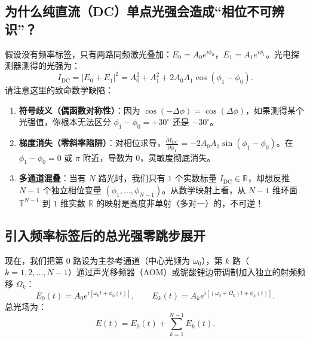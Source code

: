 \documentclass[UTF8, a4paper, 11pt]{ctexart}
\newcommand{\R}{\mathbb{R}}
\begin{document}
\subsection{为什么纯直流（DC）单点光强会造成“相位不可辨识”？}

假设没有频率标签，只有两路同频激光叠加：$E_0 = A_0 e^{i\phi_0}$，$E_1 = A_1 e^{i\phi_1}$。光电探测器测得的光强为：
\[
    I_{\mathrm{DC}} = |E_0 + E_1|^2 = A_0^2 + A_1^2 + 2A_0 A_1 \cos(\phi_1 - \phi_0).
\]
请注意这里的致命数学缺陷：
\begin{enumerate}
    \item \textbf{符号歧义（偶函数对称性）}：因为 $\cos(-\Delta\phi) = \cos(\Delta\phi)$，如果测得某个光强值，你根本无法区分 $\phi_1 - \phi_0 = +30^\circ$ 还是 $-30^\circ$。
    \item \textbf{梯度消失（零斜率陷阱）}：对相位求导，$\frac{\partial I_{\mathrm{DC}}}{\partial \phi_1} = -2A_0 A_1 \sin(\phi_1 - \phi_0)$。在 $\phi_1 - \phi_0 = 0$ 或 $\pi$ 附近，导数为 $0$，灵敏度彻底消失。
    \item \textbf{多通道混叠}：当有 $N$ 路光时，我们只有 $1$ 个实数标量 $I_{\mathrm{DC}} \in \R$，却想反推 $N-1$ 个独立相位变量 $(\phi_1, \dots, \phi_{N-1})$。从数学映射上看，从 $N-1$ 维环面 $\mathbb{T}^{N-1}$ 到 $1$ 维实数 $\R$ 的映射是高度非单射（多对一）的，不可逆！
\end{enumerate}

\subsection{引入频率标签后的总光强零跳步展开}

现在，我们把第 $0$ 路设为主参考通道（中心光频为 $\omega_0$），第 $k$ 路（$k=1,2,\dots,N-1$）通过声光移频器（AOM）或铌酸锂边带调制加入独立的射频频移 $\Omega_k$：
\[
    E_0(t) = A_0 e^{i[\omega_0 t + \phi_0(t)]}, \qquad E_k(t) = A_k e^{i[(\omega_0 + \Omega_k)t + \phi_k(t)]}.
\]
总光场为：
\[
    E(t) = E_0(t) + \sum_{k=1}^{N-1} E_k(t).
\]
\end{document}
